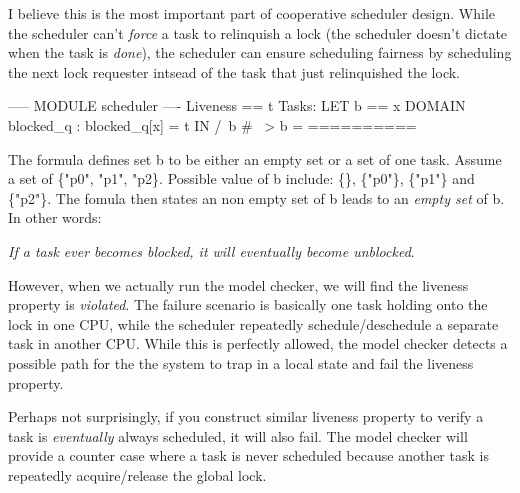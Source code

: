 I believe this is the most important part of cooperative scheduler design. While
the scheduler can't \textit{force} a task to relinquish a lock (the scheduler
doesn't dictate when the task is \textit{done}), the scheduler can ensure
scheduling fairness by scheduling the next lock requester intsead of the task 
that just relinquished the lock.\newline

\begin{tla}
----- MODULE scheduler ---- 
Liveness == 
    \A t \in Tasks:
        LET 
            b == {x \in DOMAIN blocked_q : blocked_q[x] = t}
        IN 
            /\ b # {} ~> b = {}
==========
\end{tla}
\begin{tlatex}
\@x{}\moduleLeftDash{}\moduleRightDash\@xx{}%
%
%
%
%
%
\@x{}\bottombar\@xx{}%
\end{tlatex}
\newline

The formula defines set b to be either an empty set or a set of one task. Assume
a set of \{"p0", "p1", "p2\}. Possible value of b include: \{\}, \{"p0"\},
\{"p1"\} and \{"p2"\}. The fomula then states an non empty set of b leads to an
\textit{empty set} of b. In other words: \newline

\textit{If a task ever becomes blocked, it will eventually become unblocked}.\newline

However, when we actually run the model checker, we will find the liveness
property is \textit{violated}. The failure scenario is basically one task
holding onto the lock in one CPU, while the scheduler repeatedly
schedule/deschedule a separate task in another CPU. While this is perfectly
allowed, the model checker detects a possible path for the the system to trap in
a local state and fail the liveness property.\newline 

Perhaps not surprisingly, if you construct similar liveness property to verify 
a task is \textit{eventually} always scheduled, it will also fail. The model
checker will provide a counter case where a task is never scheduled because
another task is repeatedly acquire/release the global lock.\newline

